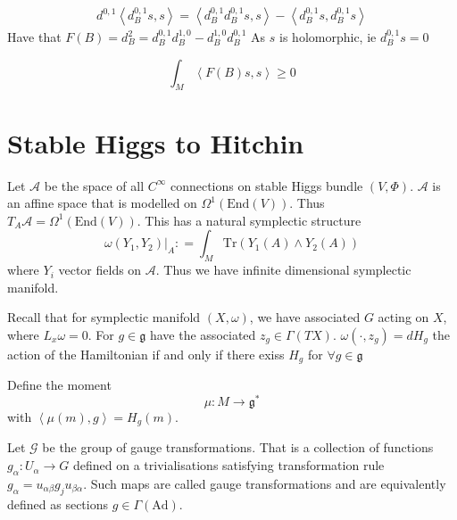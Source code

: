 \begin{align}
   d^{0,1}  \left< d_B ^{0,1} s, s \right> = \left<  d_B ^{0,1} d_B ^{0,1} s , s \right> - \left< d_B ^{0,1} s ,  d_B ^{0,1} s \right> 
\end{align}
Have that $ F(B) = d^2 _B =  d_B ^{0,1} d_B ^{1,0} - d_B ^{1,0} d_B ^{0,1} $
As $s$ is holomorphic, ie $ d_B ^{0,1} s = 0 $

\begin{equation}
    \int_M \left< F(B) s , s \right>  \geq 0 
\end{equation}




\section{Stable Higgs to Hitchin } %

Let $ \mathcal{A} $ be the space of all $C ^{\infty}$ connections on stable Higgs bundle $(V, \Phi)$. 
$\mathcal{A} $ is an affine space that is modelled on $ \Omega ^1(\mathrm{End}(V) )$. 
Thus $ T _ A \mathcal{A} = \Omega^1 ( \mathrm{End} ( V) ) $. 
This has a natural symplectic structure 
\begin{equation}
    \omega ( Y_1, Y_2 ) | _A : = \int _M \mathrm{Tr} (Y_1 ( A) \wedge Y_2 ( A) ) 
\end{equation}
where $Y_i$ vector fields on $ \mathcal{A} $. 
Thus we have infinite dimensional symplectic manifold. 

Recall that for symplectic manifold $(X, \omega)$, 
we have associated $G$ acting on $X$, where $ L_x \omega = 0 $. 
For $ g \in \mathfrak{g} $ have the associated $z_g \in \Gamma ( TX ) $.
$\omega( \cdot , z_g ) = d H_g $ the action of the Hamiltonian if and only if 
there exiss $ H_g$ for $ \forall g \in \mathfrak{g} $ 

Define the moment 
\begin{equation}
    \mu : M \rightarrow \mathfrak{g} ^ * 
\end{equation}
with $ \left< \mu (m) , g \right> = H_g ( m) $.

Let $ \mathcal{G} $ be the group of gauge transformations. 
That is a collection of functions $g_{\alpha} : U_{\alpha} \rightarrow  {G} $ defined on a trivialisations
satisfying transformation rule $ g_{\alpha} = u_{\alpha \beta} g_j u_{\beta \alpha }$. 
Such maps are called gauge transformations and are equivalently defined as sections $g \in \Gamma(\mathrm{Ad}) $.
 

